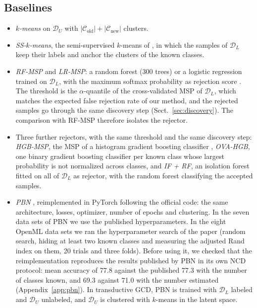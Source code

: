 \documentclass[pdflatex,sn-basic]{sn-jnl}
\newcommand{\DL}{\mathcal{D}_L}
\newcommand{\DU}{\mathcal{D}_U}
\newcommand{\Cold}{\mathcal{C}_{\mathrm{old}}}
\newcommand{\Cnew}{\mathcal{C}_{\mathrm{new}}}
\begin{document}
\subsection{Baselines}

\begin{itemize}
\item \emph{$k$-means} on $\DU$ with $|\Cold| + |\Cnew|$ clusters.
\item \emph{SS-$k$-means}, the semi-supervised $k$-means of \citet{vaze2022gcd}, in which the samples of $\DL$ keep their labels and anchor the clusters of the known classes.
\item \emph{RF-MSP} and \emph{LR-MSP}: a random forest (300 trees) or a logistic regression trained on $\DL$, with the maximum softmax probability as rejection score \citep{hendrycks2017msp}. The threshold is the $\alpha$-quantile of the cross-validated MSP of $\DL$, which matches the expected false rejection rate of our method, and the rejected samples go through the same discovery step (Sect.~\ref{sec:discovery}). The comparison with RF-MSP therefore isolates the rejector.
\item Three further rejectors, with the same threshold and the same discovery step: \emph{HGB-MSP}, the MSP of a histogram gradient boosting classifier \citep{ke2017lightgbm}, \emph{OVA-HGB}, one binary gradient boosting classifier per known class whose largest probability is not normalized across classes, and \emph{IF + RF}, an isolation forest \citep{liu2008iforest} fitted on all of $\DL$ as rejector, with the random forest classifying the accepted samples.
\item \emph{PBN} \citep{troisemaine2024pbn}, reimplemented in PyTorch following the official code: the same architecture, losses, optimizer, number of epochs and clustering. In the seven data sets of PBN we use the published hyperparameters. In the eight OpenML data sets we ran the hyperparameter search of the paper (random search, hiding at least two known classes and measuring the adjusted Rand index on them, 20 trials and three folds). Before using it, we checked that the reimplementation reproduces the results published by PBN in its own NCD protocol: mean accuracy of 77.8 against the published 77.3 with the number of classes known, and 69.3 against 71.0 with the number estimated (Appendix~\ref{app:pbn}). In transductive GCD, PBN is trained with $\DL$ labeled and $\DU$ unlabeled, and $\DU$ is clustered with $k$-means in the latent space.
\end{itemize}
\end{document}
